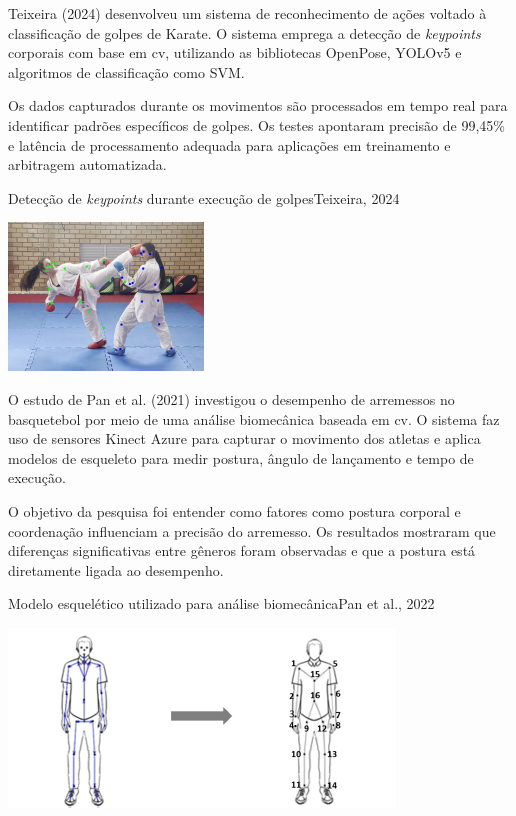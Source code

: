 Teixeira (2024) desenvolveu um sistema de reconhecimento de ações voltado à classificação de golpes de Karate. O sistema emprega a detecção de \textit{keypoints} corporais com base em \ac{cv}, 
utilizando as bibliotecas OpenPose, YOLOv5 e algoritmos de classificação como SVM.

Os dados capturados durante os movimentos são processados em tempo real para identificar padrões específicos de golpes. Os testes apontaram precisão de 99,45\% e latência de processamento adequada para aplicações em treinamento e arbitragem automatizada.

\begin{figura}{Detecção de \textit{keypoints} durante execução de golpes}{Teixeira, 2024}
    \begin{flushleft}
        \label{fig:keypoints}
        \includegraphics[width=0.36\linewidth]{resources/floats/ilustracoes/KEYPOINTS.png}
    \end{flushleft}
\end{figura}
\FloatBarrier


O estudo de Pan et al. (2021) investigou o desempenho de arremessos no basquetebol por meio de uma análise biomecânica baseada em \ac{cv}. 
O sistema faz uso de sensores Kinect Azure para capturar o movimento dos atletas e aplica modelos de esqueleto para medir postura, ângulo de lançamento e tempo de execução.

O objetivo da pesquisa foi entender como fatores como postura corporal e coordenação influenciam a precisão do arremesso. 
Os resultados mostraram que diferenças significativas entre gêneros foram observadas e que a postura está diretamente ligada ao desempenho.

\begin{figura}{Modelo esquelético utilizado para análise biomecânica}{Pan et al., 2022}
    \begin{flushleft}
        \label{fig:esqueleto}
        \includegraphics[width=0.48\linewidth]{resources/floats/ilustracoes/ESQUELETO.png}
    \end{flushleft}
\end{figura}
\FloatBarrier

